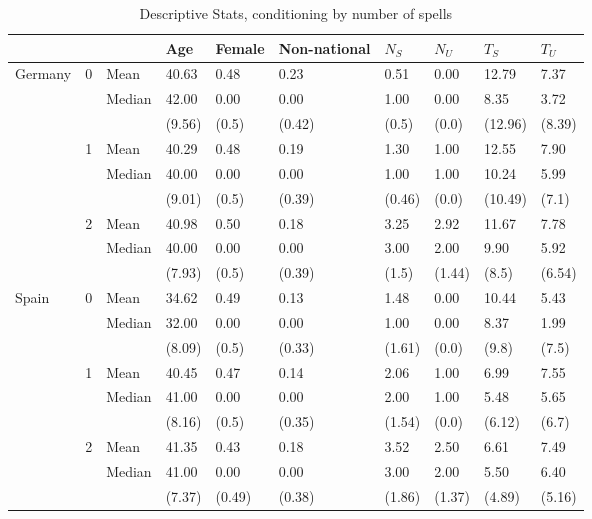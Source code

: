 \documentclass[12pt]{article}
\theoremstyle{definition}
\theoremstyle{remark}
\begin{document}
\begin{appendices}
\begin{table}[]
\caption{Descriptive Stats, conditioning by number of spells}
    \centering
 \begin{tabular}{llllllllll}
\toprule
 &  &  & Age & Female & Non-national & $N_S$ & $N_U$ & $T_S$ & $T_U$ \\
\midrule
Germany & 0 & Mean & 40.63 & 0.48 & 0.23 & 0.51 & 0.00 & 12.79 & 7.37 \\
 &  & Median & 42.00 & 0.00 & 0.00 & 1.00 & 0.00 & 8.35 & 3.72 \\
 &  &  & (9.56) & (0.5) & (0.42) & (0.5) & (0.0) & (12.96) & (8.39) \\
 & 1 & Mean & 40.29 & 0.48 & 0.19 & 1.30 & 1.00 & 12.55 & 7.90 \\
 &  & Median & 40.00 & 0.00 & 0.00 & 1.00 & 1.00 & 10.24 & 5.99 \\
 &  &  & (9.01) & (0.5) & (0.39) & (0.46) & (0.0) & (10.49) & (7.1) \\
 & 2 & Mean & 40.98 & 0.50 & 0.18 & 3.25 & 2.92 & 11.67 & 7.78 \\
 &  & Median & 40.00 & 0.00 & 0.00 & 3.00 & 2.00 & 9.90 & 5.92 \\
 &  &  & (7.93) & (0.5) & (0.39) & (1.5) & (1.44) & (8.5) & (6.54) \\
\midrule
Spain & 0 & Mean & 34.62 & 0.49 & 0.13 & 1.48 & 0.00 & 10.44 & 5.43 \\
 &  & Median & 32.00 & 0.00 & 0.00 & 1.00 & 0.00 & 8.37 & 1.99 \\
 &  &  & (8.09) & (0.5) & (0.33) & (1.61) & (0.0) & (9.8) & (7.5) \\
 & 1 & Mean & 40.45 & 0.47 & 0.14 & 2.06 & 1.00 & 6.99 & 7.55 \\
 &  & Median & 41.00 & 0.00 & 0.00 & 2.00 & 1.00 & 5.48 & 5.65 \\
 &  &  & (8.16) & (0.5) & (0.35) & (1.54) & (0.0) & (6.12) & (6.7) \\
 & 2 & Mean & 41.35 & 0.43 & 0.18 & 3.52 & 2.50 & 6.61 & 7.49 \\
 &  & Median & 41.00 & 0.00 & 0.00 & 3.00 & 2.00 & 5.50 & 6.40 \\
 &  &  & (7.37) & (0.49) & (0.38) & (1.86) & (1.37) & (4.89) & (5.16) \\
\bottomrule
\end{tabular}
    \label{tab:descriptive_stats_bins}
\end{table}

\end{appendices}
\end{document}
